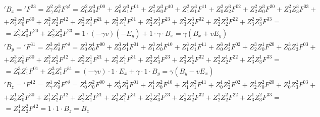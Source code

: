 \begin{gather*}
'B_x ='F^{23} = Z^2_\gamma Z^3_\delta F^{\gamma \delta} = Z^2_0 Z^3_0 F^{00}+Z^2_0 Z^3_1 F^{01}+Z^2_1 Z^3_0 F^{10}+Z^2_1 Z^3_1 F^{11}+Z^2_0 Z^3_2 F^{02}+Z^2_2 Z^3_0 F^{20}+Z^2_0 Z^3_3 F^{03}+\\+Z^2_3 Z^3_0 F^{30}+Z^2_1 Z^3_2 F^{12}+Z^2_2 Z^3_1 F^{21}+Z^2_3 Z^3_1 F^{31}+Z^2_2 Z^3_3 F^{23}+Z^2_3 Z^3_2 F^{32}+Z^2_2 Z^3_2 F^{22}+Z^2_3 Z^3_3 F^{33}=\\
=Z^2_2 Z^3_0 F^{20}+Z^2_2 Z^3_3 F^{23}=1 \cdot (-\gamma v)(-E_y)+1 \cdot \gamma \cdot B_x=\gamma (B_x+vE_y)
\end{gather*}
\begin{gather*}
'B_y ='F^{31} = Z^3_\gamma Z^1_\delta F^{\gamma \delta} = Z^3_0 Z^1_0 F^{00}+Z^3_0 Z^1_1 F^{01}+Z^3_1 Z^1_0 F^{10}+Z^3_1 Z^1_1 F^{11}+Z^3_0 Z^1_2 F^{02}+Z^3_2 Z^1_0 F^{20}+Z^3_0 Z^1_3 F^{03}+\\+Z^3_3 Z^1_0 F^{30}+Z^3_1 Z^1_2 F^{12}+Z^3_2 Z^1_1 F^{21}+Z^3_3 Z^1_1 F^{31}+Z^3_2 Z^1_3 F^{23}+Z^3_3 Z^1_2 F^{32}+Z^3_2 Z^1_2 F^{22}+Z^3_3 Z^1_3 F^{33}=\\
=Z^3_0 Z^1_1 F^{01}+Z^3_3 Z^1_1 F^{31}=(-\gamma v)\cdot 1 \cdot E_x+\gamma \cdot 1 \cdot B_y = \gamma(B_y-vE_x)
\end{gather*}
\begin{gather*}
'B_z ='F^{12} = Z^1_\gamma Z^2_\delta F^{\gamma \delta} = Z^1_0 Z^2_0 F^{00}+Z^1_0 Z^2_1 F^{01}+Z^1_1 Z^2_0 F^{10}+Z^1_1 Z^2_1 F^{11}+Z^1_0 Z^2_2 F^{02}+Z^1_2 Z^2_0 F^{20}+Z^1_0 Z^2_3 F^{03}+\\+Z^1_3 Z^2_0 F^{30}+Z^1_1 Z^2_2 F^{12}+Z^1_2 Z^2_1 F^{21}+Z^1_3 Z^2_1 F^{31}+Z^1_2 Z^2_3 F^{23}+Z^1_3 Z^2_2 F^{32}+Z^1_2 Z^2_2 F^{22}+Z^1_3 Z^2_3 F^{33}=\\
=Z^1_1 Z^2_2 F^{12} = 1\cdot 1\cdot B_z = B_z
\end{gather*}
